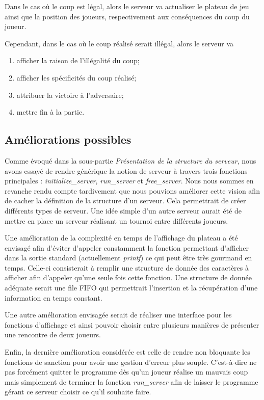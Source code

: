 \documentclass[11pt]{article}
\begin{document}
Dans le cas où le coup est légal, alors le serveur va actualiser le plateau de jeu ainsi que la position des joueurs, respectivement aux conséquences du coup du joueur.

Cependant, dans le cas où le coup réalisé serait illégal, alors le serveur va
\begin{enumerate}
    \item afficher la raison de l'illégalité du coup;
    \item afficher les spécificités du coup réalisé;
    \item attribuer la victoire à l'adversaire;
    \item mettre fin à la partie.
\end{enumerate}


\subsection{Améliorations possibles}

Comme évoqué dans la sous-partie \textit{Présentation de la structure du serveur}, nous avons essayé de rendre générique la notion de serveur à travers trois fonctions principales : \textit{initialize\_server}, \textit{run\_server} et \textit{free\_server}. Nous nous sommes en revanche rendu compte tardivement que nous pouvions améliorer cette vision afin de cacher la définition de la structure d'un serveur. Cela permettrait de créer différents types de serveur. Une idée simple d'un autre serveur aurait été de mettre en place un serveur réalisant un tournoi entre différents joueurs.

Une amélioration de la complexité en temps de l'affichage du plateau a été envisagé afin d'éviter d'appeler constamment la fonction permettant d'afficher dans la sortie standard (actuellement \textit{printf}) ce qui peut être très gourmand en temps. Celle-ci consisterait à remplir une structure de donnée des caractères à afficher afin d'appeler qu'une seule fois cette fonction. Une structure de donnée adéquate serait une file FIFO qui permettrait l'insertion et la récupération d'une information en temps constant.

Une autre amélioration envisagée serait de réaliser une interface pour les fonctions d'affichage et ainsi pouvoir choisir entre plusieurs manières de présenter une rencontre de deux joueurs.

Enfin, la dernière amélioration considérée est celle de rendre non bloquante les fonctions de sanction pour avoir une gestion d'erreur plus souple. C'est-à-dire ne pas forcément quitter le programme dès qu'un joueur réalise un mauvais coup mais simplement de terminer la fonction \textit{run\_server} afin de laisser le programme gérant ce serveur choisir ce qu'il souhaite faire.
\end{document}
